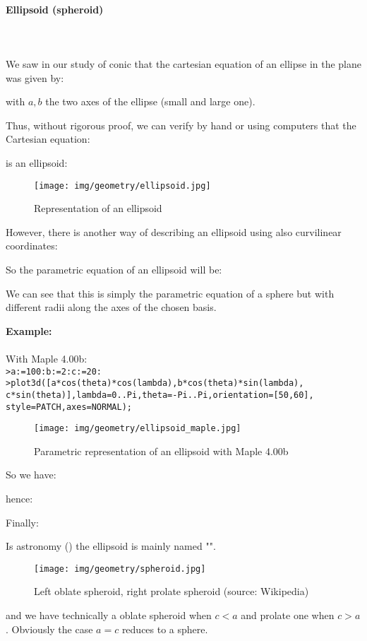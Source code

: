 {	\pagebreak
	\paragraph{Ellipsoid (spheroid)}\mbox{}\\\\
	We saw in our study of conic that the cartesian equation of an ellipse in the plane was given by:
	
	with $a, b$ the two axes of the ellipse (small and large one).
	
	Thus, without rigorous proof, we can verify by hand or using computers that the Cartesian equation:
	
	is an ellipsoid:
	\begin{figure}[H]
		\centering
		\texttt{[image: img/geometry/ellipsoid.jpg]}
		\caption{Representation of an ellipsoid}
	\end{figure}
	However, there is another way of describing an ellipsoid using also curvilinear coordinates:
	
	So the parametric equation of an ellipsoid will be:
	
	We can see that this is simply the parametric equation of a sphere but with different radii along the axes of the chosen basis.
	\begin{tcolorbox}[colframe=black,colback=white,sharp corners]
	\textbf{{\Large {}}Example:}\\\\
	With Maple 4.00b:\\

	\texttt{>a:=100:b:=2:c:=20:\\
>plot3d([a*cos(theta)*cos(lambda),b*cos(theta)*sin(lambda),\\
c*sin(theta)],lambda=0..Pi,theta=-Pi..Pi,orientation=[50,60],\\
style=PATCH,axes=NORMAL);
	}
	\begin{figure}[H]
		\centering
		\texttt{[image: img/geometry/ellipsoid\_maple.jpg]}
		\caption{Parametric representation of an ellipsoid with Maple 4.00b}
	\end{figure}
	\end{tcolorbox}
	So we have:
	
	hence:
	
	Finally:
	
	Is astronomy () the ellipsoid is mainly named "".
	\begin{figure}[H]
		\centering
		\texttt{[image: img/geometry/spheroid.jpg]}
		\caption[Left oblate spheroid, right prolate spheroid]{Left oblate spheroid, right prolate spheroid (source: Wikipedia)}
	\end{figure}
	and we have technically a oblate spheroid when $c<a$ and prolate one when $c>a$. Obviously the case $a = c$ reduces to a sphere.
	
}
